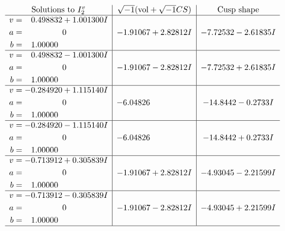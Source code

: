 \documentclass[1p]{elsarticle_modified}
\theoremstyle{definition}
\newcommand{\I}{\sqrt{-1}}
\begin{document}
$$\begin{array}{c|c|c}  
\text{Solutions to }I^v_{2}& \I (\text{vol} + \sqrt{-1}CS) & \text{Cusp shape}\\
 \hline 
\begin{aligned}
v &= \phantom{-}0.498832 + 1.001300 I \\
a &= \phantom{-0.000000 } 0 \\
b &= \phantom{-}1.00000\phantom{ +0.000000I}\end{aligned}
 & -1.91067 + 2.82812 I & -7.72532 - 2.61835 I \\ \hline\begin{aligned}
v &= \phantom{-}0.498832 - 1.001300 I \\
a &= \phantom{-0.000000 } 0 \\
b &= \phantom{-}1.00000\phantom{ +0.000000I}\end{aligned}
 & -1.91067 - 2.82812 I & -7.72532 + 2.61835 I \\ \hline\begin{aligned}
v &= -0.284920 + 1.115140 I \\
a &= \phantom{-0.000000 } 0 \\
b &= \phantom{-}1.00000\phantom{ +0.000000I}\end{aligned}
 & -6.04826\phantom{ +0.000000I} & -14.8442 - 0.2733 I \\ \hline\begin{aligned}
v &= -0.284920 - 1.115140 I \\
a &= \phantom{-0.000000 } 0 \\
b &= \phantom{-}1.00000\phantom{ +0.000000I}\end{aligned}
 & -6.04826\phantom{ +0.000000I} & -14.8442 + 0.2733 I \\ \hline\begin{aligned}
v &= -0.713912 + 0.305839 I \\
a &= \phantom{-0.000000 } 0 \\
b &= \phantom{-}1.00000\phantom{ +0.000000I}\end{aligned}
 & -1.91067 + 2.82812 I & -4.93045 - 2.21599 I \\ \hline\begin{aligned}
v &= -0.713912 - 0.305839 I \\
a &= \phantom{-0.000000 } 0 \\
b &= \phantom{-}1.00000\phantom{ +0.000000I}\end{aligned}
 & -1.91067 - 2.82812 I & -4.93045 + 2.21599 I\\
 \hline 
 \end{array}$$\newpage
\end{document}
